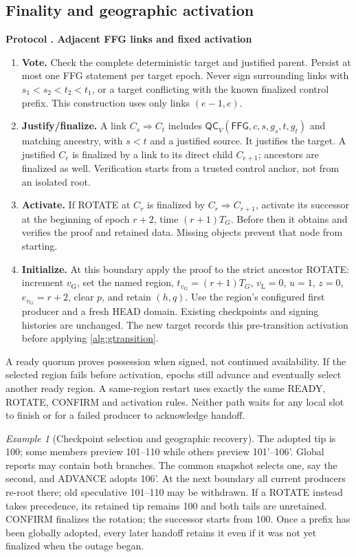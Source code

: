 \documentclass[11pt,a4paper,onecolumn]{article}
\newcommand{\QC}{\mathsf{QC}}
\newcommand{\gv}{v_{\mathrm G}}
\newcommand{\lv}{v_{\mathrm L}}
\newcommand{\Tag}[1]{\mathsf{#1}}
\theoremstyle{remark}\newtheorem{example}[definition]{Example}
\newcounter{protocol}
\newenvironment{protocol}[2]{\refstepcounter{protocol}\label{#1}\begin{mdframed}[nobreak=true,linewidth=.6pt,skipabove=10pt,skipbelow=10pt,innertopmargin=8pt,innerbottommargin=8pt]\small\raggedright\noindent\textbf{Protocol \theprotocol. #2}\par\smallskip}{\end{mdframed}}
\begin{document}
\subsection{Finality and geographic activation}\label{sec:finality}
\begin{protocol}{alg:finality}{Adjacent FFG links and fixed activation}
\begin{enumerate}[label=\textbf{F\arabic*.}]
\item \textbf{Vote.} Check the complete deterministic target and justified
parent. Persist at most one FFG statement per target epoch. Never sign
surrounding links with $s_1<s_2<t_2<t_1$, or a target conflicting with the
known finalized control prefix. This construction uses only links $(e-1,e)$.
\item \textbf{Justify/finalize.} A link $C_s\Rightarrow C_t$ includes
$\QC_V(\Tag{FFG},c,s,g_s,t,g_t)$ and matching ancestry, with $s<t$ and a
justified source. It justifies the target. A justified $C_e$ is finalized by a
link to its direct child $C_{e+1}$; ancestors are finalized as well.
Verification starts from a trusted control anchor, not from an isolated root.
\item \textbf{Activate.} If ROTATE at $C_r$ is finalized by
$C_r\Rightarrow C_{r+1}$, activate its successor at the beginning of epoch
$r+2$, time $(r+1)T_G$. Before then it obtains and verifies the proof and
retained data. Missing objects prevent that node from starting.
\item \textbf{Initialize.} At this boundary apply the proof to the strict
ancestor ROTATE: increment $\gv$, set the named region, $t_{\gv}=(r+1)T_G$,
$\lv=0$, $u=1$, $z=0$, $e_{\gv}=r+2$, clear $p$, and retain $(h,q)$.
Use the region's configured first producer and a fresh HEAD domain. Existing
checkpoints and signing histories are unchanged. The new target records this
pre-transition activation before applying \cref{alg:gtransition}.
\end{enumerate}
\end{protocol}

A ready quorum proves possession when signed, not continued availability.
If the selected region fails before activation, epochs still advance and
eventually select another ready region. A same-region restart uses exactly
the same READY, ROTATE, CONFIRM and activation rules. Neither path waits for
any local slot to finish or for a failed producer to acknowledge handoff.

\begin{example}[Checkpoint selection and geographic recovery]
The adopted tip is 100; some members preview 101--110 while others preview
101'--106'. Global reports may contain both branches. The common snapshot
selects one, say the second, and ADVANCE adopts 106'. At the next boundary all
current producers re-root there; old speculative 101--110 may be withdrawn.
If a ROTATE instead takes precedence, its retained tip remains 100 and both
tails are unretained. CONFIRM finalizes the rotation; the successor starts
from 100. Once a prefix has been globally adopted, every later handoff retains
it even if it was not yet finalized when the outage began.
\end{example}
\end{document}
